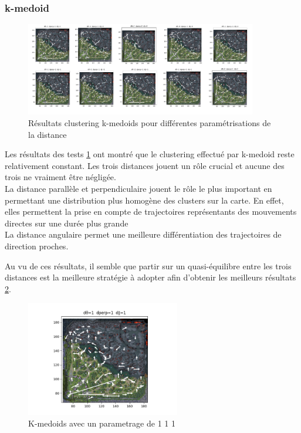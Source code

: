 \newpage
\subsubsection{k-medoid}
\begin{figure}[h!]
    \centering
    \includegraphics[width=0.9\textwidth]{Images/kmedoid/kmedoid_variationsV2.png}
    \caption{Résultats clustering k-medoids pour différentes paramétrisations de la distance}
    \label{fig:kmed_seq}
\end{figure}

Les résultats des tests \ref{fig:kmed_seq} ont montré que le clustering effectué par k-medoid reste relativement constant. Les trois distances jouent un rôle crucial et aucune des trois ne vraiment être négligée. \\
La distance parallèle et perpendiculaire jouent le rôle le plus important en permettant une distribution plus homogène des clusters sur la carte. En effet, elles permettent la prise en compte de trajectoires représentants des mouvements directes sur une durée plus grande\\
La distance angulaire  permet une meilleure différentiation des trajectoires de direction proches.

Au vu de ces résultats, il semble que partir sur un quasi-équilibre entre les trois distances est la meilleure stratégie à adopter afin d'obtenir les meilleurs résultats \ref{fig:kmed_op}.
\begin{figure}[h!]
    \centering
    \includegraphics[width=0.6\textwidth]{Images/kmedoid/kmed1_1_1_1.png}
    \caption{K-medoids avec un parametrage de 1 1 1}
    \label{fig:kmed_op}
\end{figure}


